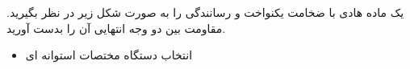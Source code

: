 
\begin{ELexample}{}

یک ماده هادی با ضخامت یکنواخت  و رسانندگی \ELim{\sigma} را به صورت شکل زیر در نظر بگیرید. مقاومت بین دو وجه انتهایی آن را بدست آورید.


\begin{ELsolution}

\begin{itemize}
\tightlist
\item
  انتخاب دستگاه مختصات استوانه ای
\end{itemize}


\end{ELsolution}

\end{ELexample}
